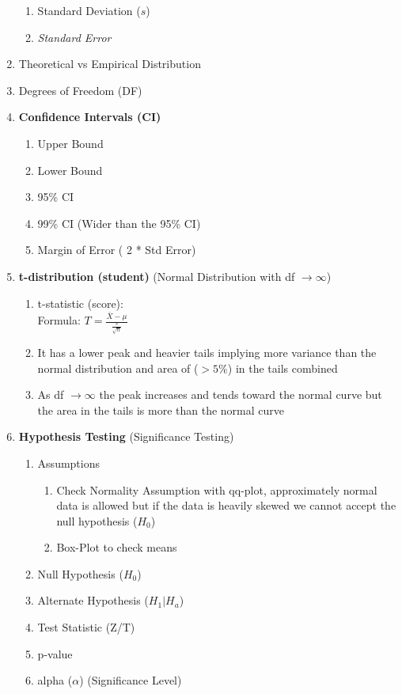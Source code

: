\documentclass[11pt]{article}
\begin{document}
\begin{enumerate}
\begin{enumerate}
			\item Standard Deviation ($s$)
			\item \textit{Standard Error}
		\end{enumerate}
		\item Theoretical vs Empirical Distribution
		\item Degrees of Freedom (DF)
		\item \textbf{Confidence Intervals (CI)}
		\begin{enumerate}
			\item Upper Bound
			\item Lower Bound
			\item 95\% CI
			\item 99\% CI (Wider than the 95\% CI)
			\item Margin of Error ( 2 * Std Error)
		\end{enumerate}
		\item \textbf{t-distribution (student)} (Normal Distribution with df $ \to \infty$)
		\begin{enumerate}
			\item t-statistic (score):\\
			Formula: 
			$T = \frac{ \bar{X} - \mu}{ \frac{s}{\sqrt{n}} }$
			\item It has a lower peak and heavier tails implying more variance than the normal distribution and area of ($> 5\%$) in the tails combined
			\item As df $\to \infty$ the peak increases and tends toward the normal curve but the area in the tails is more than the normal curve
		\end{enumerate}
		\item \textbf{Hypothesis Testing} (Significance Testing)
		\begin{enumerate}
			\item Assumptions
			\begin{enumerate}
				\item Check Normality Assumption with qq-plot, approximately normal data is allowed but if the data is heavily skewed we cannot accept the null hypothesis ($H_0$)
				\item Box-Plot to check means
			\end{enumerate}
			\item Null Hypothesis ($H_0$) 
			\item Alternate Hypothesis ($H_1 | H_a$)
			\item Test Statistic (Z/T)
			\item p-value 
			\item alpha ($\alpha$) (Significance Level)

\end{enumerate}
\end{enumerate}
\end{document}
